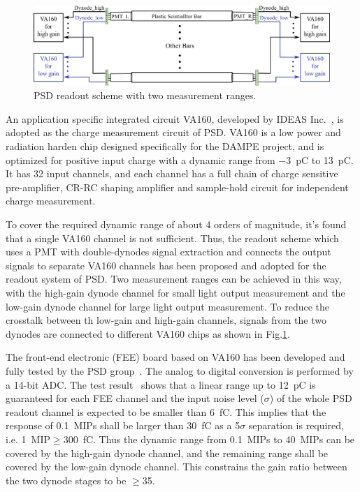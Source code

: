 \documentclass[preprint, times]{elsarticle}
\begin{document}
\begin{figure}
\centering
 \includegraphics[width=140mm]{readout_scheme}
\caption{PSD readout scheme with two measurement ranges.}
\label{fig:readout_scheme}
\end{figure}

An application specific integrated circuit VA160, developed by IDEAS Inc.~\cite{va160}, is adopted as the charge measurement circuit of PSD.
VA160 is a low power and radiation harden chip designed specifically for the DAMPE project, and is optimized for positive input charge  with a dynamic range from \SI{-3}{\pico\coulomb} to \SI{13}{\pico\coulomb}.
It has 32 input channels, and each channel has a full chain of charge sensitive pre-amplifier, CR-RC shaping amplifier and sample-hold circuit for independent charge measurement.

To cover the required dynamic range of about 4 orders of magnitude, it's found that a single VA160 channel is not sufficient. 
Thus, the readout scheme which uses a PMT with double-dynodes signal extraction and connects the output signals to separate VA160 channels has been proposed and adopted for the readout system of PSD. 
Two measurement ranges can be achieved in this way, with the high-gain dynode channel for small light output measurement and the low-gain dynode channel for large light output measurement. 
To reduce the crosstalk between th low-gain and high-gain channels, signals from the two dynodes are connected to different VA160 chips as shown in Fig.\ref{fig:readout_scheme}.

The front-end electronic (FEE) board based on VA160 has been developed and fully tested by the PSD group~\cite{fee}. 
The analog to digital conversion is performed by a 14-bit ADC. 
The test result~\cite{fee} shows that a linear range up to \SI{12}{\pico\coulomb} is guaranteed for each FEE channel and the input noise level ($\sigma$) of the whole PSD readout channel is expected to be smaller than \SI{6}{\femto\coulomb}. 
This implies that the response of \SI{0.1}{MIPs} shall be larger than \SI{30}{\femto\coulomb} as a 5$\sigma$ separation is required, i.e. \SI{1}{MIP}$\geq$\SI{300}{\femto\coulomb}.
Thus the dynamic range from \SI{0.1}{MIPs} to \SI{40}{MIPs} can be covered by the high-gain dynode channel, and the remaining range shall be covered by the low-gain dynode channel.
This constrains the gain ratio between the two dynode stages to be $\geq$35.
\end{document}
